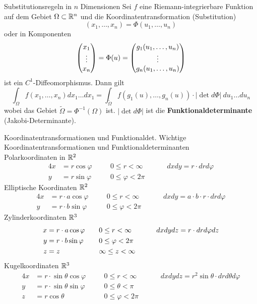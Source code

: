 \begin{Satz}{Substitutionsregeln in $n$ Dimensionen}{}
    Sei $f$ eine Riemann-integrierbare Funktion auf dem Gebiet $\Omega \subset \mathbb{R}^n$ und die Koordinatentransformation (Substitution)
    \[
    (x_1,\hdots,x_n) = \Phi(u_1, \hdots,  u_n)
    \]
    oder in Komponenten
    \[
        \begin{pmatrix} x_1 \\ \vdots \\ x_n \end{pmatrix}
        = \Phi(u)
        = \begin{pmatrix} g_1(u_1,\hdots,u_n) \\ \vdots \\ g_n(u_1,\hdots,u_n) \end{pmatrix}
    \]
    ist ein $C^1$-Diffeomorphismus. Dann gilt
    \[
        \int_\Omega f(x_1, \hdots, x_n)dx_1\hdots dx_1 = \int_{\widetilde{\Omega}} f(g_1(u), \hdots, g_n(u)) \cdot |\det d \Phi|\ du_1\hdots du_n
    \]
    wobei das Gebiet $\widetilde{\Omega} = \Phi^{-1}(\Omega)$ ist. $|\det d\Phi|$ ist die \textbf{Funktionaldeterminante} (Jakobi-Determinante).
\end{Satz}

\begin{Rechenregeln}{Koordinatentransformationen und Funktionaldet.}{}
	Wichtige Koordinatentransformationen und Funktionaldeterminanten\\
	
	Polarkoordinaten in $\mathbb{R}^2$
	\begin{alignat*}{4}
            x &= r \cos \varphi \quad &&0 \leq r < \infty \quad &&&dxdy = r \cdot drd\varphi\\
            y &= r \sin \varphi \quad &&0 \leq \varphi < 2\pi &&&
    \end{alignat*}
   	Elliptische Koordinaten $\mathbb{R}^2$
   	\begin{alignat*}{4}
            x &= r \cdot  a \cos \varphi\quad &&0 \leq r < \infty\quad &&&dxdy = a \cdot b \cdot  r \cdot drd\varphi\\
            y &= r \cdot b \sin \varphi\quad &&0 \leq \varphi < 2\pi &&&
   	\end{alignat*}
        Zylinderkoordinaten $\mathbb{R}^3$ \begin{alignat*}{4}
            x &= r \cdot  a \cos \varphi\quad &&0 \leq r < \infty &&&dxdydz = r \cdot drd\varphi dz\\
            y &= r \cdot b \sin \varphi\quad &&0 \leq \varphi < 2\pi\\
            z &= z\quad &&\-\infty \leq z < \infty\quad
    	\end{alignat*}
        Kugelkoordinaten $\mathbb{R}^3$ \begin{alignat*}{4}
            x &= r \cdot \sin \theta \cos \varphi \quad &&0 \leq r < \infty \quad &&&dxdydz = r^2 \sin \theta \cdot drd\theta d\varphi\\
            y &= r \cdot \sin \theta \sin \varphi \quad && 0 \leq \theta < \pi &&&\\
            z &= r \cos \theta \quad &&0 \leq \varphi < 2\pi &&&
        \end{alignat*}
\end{Rechenregeln}
